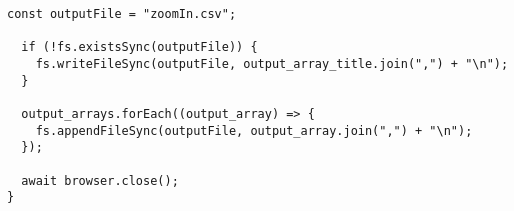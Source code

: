 \begin{lstlisting}[caption={PuppeteerとResource Timing APIを用いたズーム時の画像の読み込み時間の測定},label={lst:PuppeteerとResource Timing APIを用いたズーム時の画像の読み込み時間の測定}]
  const outputFile = "zoomIn.csv";

  if (!fs.existsSync(outputFile)) {
    fs.writeFileSync(outputFile, output_array_title.join(",") + "\n");
  }

  output_arrays.forEach((output_array) => {
    fs.appendFileSync(outputFile, output_array.join(",") + "\n");
  });

  await browser.close();
}

\end{lstlisting}